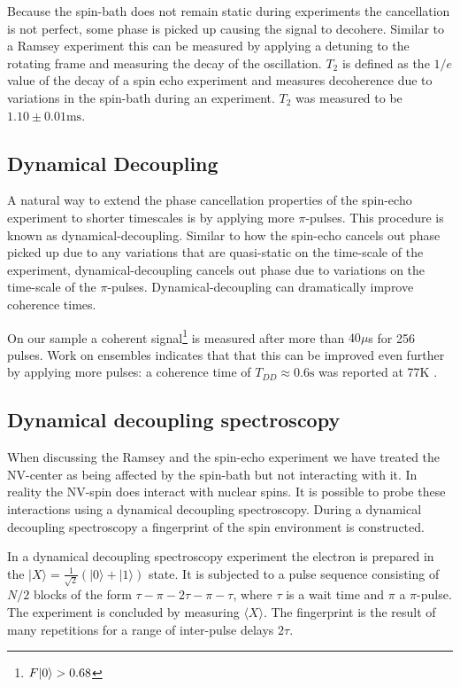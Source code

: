 Because the spin-bath does not remain static during experiments the cancellation is not perfect, some phase is picked up causing the signal to decohere.
Similar to a Ramsey experiment this can be measured by applying a detuning to the rotating frame and measuring the decay of the oscillation.
$T_2$ is defined as the $1/e$ value of the decay of a spin echo experiment and measures decoherence due to variations in the spin-bath during an experiment.
$T_2$ was measured to be $1.10 \pm 0.01 \mathrm{ms}$.

\subsection{Dynamical Decoupling}
A natural way to extend the phase cancellation properties of the spin-echo experiment to shorter timescales is by applying more $\pi$-pulses.
This procedure is known as dynamical-decoupling.
Similar to how the spin-echo cancels out phase picked up due to any variations that are quasi-static on the time-scale of the experiment, dynamical-decoupling cancels out phase due to variations on the time-scale of the $\pi$-pulses.
Dynamical-decoupling can dramatically improve coherence times\citep{Lange2010Universal}.

On our sample a coherent signal\footnote{$F{\left\vert{0}\right\rangle} > 0.68$} is measured after more than $40 \mu$s for 256 pulses.
Work on ensembles indicates that that this can be improved even further by applying more pulses: a coherence time of $T_{DD} \approx 0.6 \mathrm{s}$ was reported at 77K \citep{Gill2013SolidState}.

\subsection{Dynamical decoupling spectroscopy}

When discussing the Ramsey and the spin-echo experiment we have treated the NV-center as being affected by the spin-bath but not interacting with it.
In reality the NV-spin does interact with nuclear spins.
It is possible to probe these interactions using a dynamical decoupling spectroscopy.
During a dynamical decoupling spectroscopy a fingerprint of the spin environment is constructed.

In a dynamical decoupling spectroscopy experiment the electron is prepared in the $|X\rangle =\tfrac{1}{\sqrt{2}}\left( |0\rangle +|1\rangle \right) $ state.
It is subjected to a pulse sequence consisting of $N/2$ blocks of the form {$\tau - \pi -2\tau-\pi-\tau$}, where $\tau$ is a wait time and $\pi$ a $\pi$-pulse.
The experiment is concluded by measuring $\langle X\rangle $.
The fingerprint is the result of many repetitions for a range of inter-pulse delays $2\tau$.

